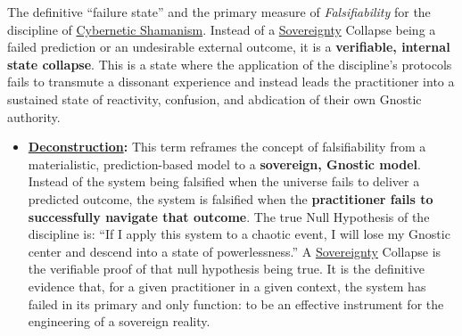 \item[\hypertarget{gloss:sovereignty_collapse}{Sovereignty Collapse}]
    The definitive ``failure state'' and the primary measure of \textit{Falsifiability} for the discipline of \hyperlink{gloss:cybernetic_shamanism}{Cybernetic Shamanism}. Instead of a \hyperlink{gloss:sovereignty}{Sovereignty} Collapse being a failed prediction or an undesirable external outcome, it is a \textbf{verifiable, internal state collapse}. This is a state where the application of the discipline's protocols fails to transmute a dissonant experience and instead leads the practitioner into a sustained state of reactivity, confusion, and abdication of their own Gnostic authority.
    \begin{itemize}
        \item \textbf{\hyperlink{gloss:deconstruction}{Deconstruction}:} This term reframes the concept of falsifiability from a materialistic, prediction-based model to a \textbf{sovereign, Gnostic model}. Instead of the system being falsified when the universe fails to deliver a predicted outcome, the system is falsified when the \textbf{practitioner fails to successfully navigate that outcome}. The true Null Hypothesis of the discipline is: ``If I apply this system to a chaotic event, I will lose my Gnostic center and descend into a state of powerlessness.'' A \hyperlink{gloss:sovereignty}{Sovereignty} Collapse is the verifiable proof of that null hypothesis being true. It is the definitive evidence that, for a given practitioner in a given context, the system has failed in its primary and only function: to be an effective instrument for the engineering of a sovereign reality.
    \end{itemize}

